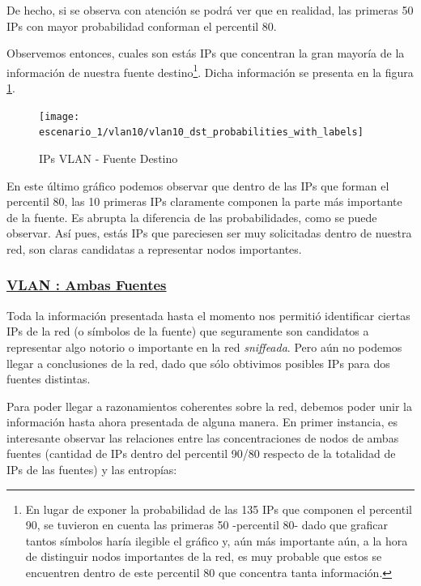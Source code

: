     \par De hecho, si se observa con atenci\'on se podr\'a ver que en realidad, las primeras
    50 IPs con mayor probabilidad conforman el percentil 80.

    \par Observemos entonces, cuales son est\'as IPs que concentran la gran mayor\'ia
    de la informaci\'on de nuestra fuente destino\footnote{En lugar de exponer la probabilidad
    de las 135 IPs que componen el percentil 90, se tuvieron en cuenta las primeras 50 -percentil
    80- dado que graficar tantos s\'imbolos har\'ia ilegible el gr\'afico y, a\'un m\'as importante
    a\'un, a la hora de distinguir nodos importantes de la red, es muy probable que estos
    se encuentren dentro de este percentil 80 que concentra tanta informaci\'on.}. Dicha informaci\'on
    se presenta en la figura \ref{fig:vlan10_dst_prob_ips}.

    \begin{figure}[!ht]
        \centering
        \texttt{[image: escenario\_1/vlan10/vlan10\_dst\_probabilities\_with\_labels]}
        \caption{IPs VLAN  - Fuente Destino}
        \label{fig:vlan10_dst_prob_ips}
    \end{figure}

    \par En este \'ultimo gr\'afico podemos observar que dentro de las IPs que forman el percentil 80,
    las 10 primeras IPs claramente componen la parte m\'as importante de la fuente. Es abrupta
    la diferencia de las probabilidades, como se puede observar. As\'i pues, est\'as IPs que 
    pareciesen ser muy solicitadas dentro de nuestra red, son claras candidatas a representar
    nodos importantes.


    \subsubsection*{\underline{VLAN : Ambas Fuentes}}\label{subsubsec:vlan10_src_dst}
    \par Toda la informaci\'on presentada hasta el momento nos permiti\'o identificar ciertas IPs
    de la red (o s\'imbolos de la fuente) que seguramente son candidatos a representar algo notorio
    o importante en la red \textit{sniffeada}. Pero a\'un no podemos llegar a conclusiones de la red,
    dado que s\'olo obtivimos posibles IPs para dos fuentes distintas.

    \par Para poder llegar a razonamientos coherentes sobre la red, debemos poder unir la informaci\'on
    hasta ahora presentada de alguna manera. En primer instancia, es interesante observar las
    relaciones entre las concentraciones de nodos de ambas fuentes (cantidad de IPs dentro del percentil
    90/80 respecto de la totalidad de IPs de las fuentes) y las entrop\'ias:


